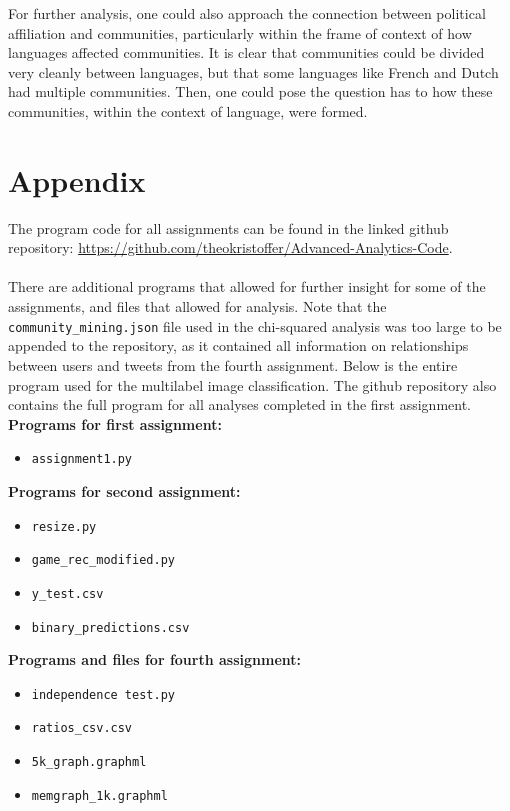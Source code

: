 \documentclass{article}
\begin{document}
For further analysis, one could also approach the connection between political affiliation and communities, particularly within the frame of context of how languages affected communities. It is clear that communities could be divided very cleanly between languages, but that some languages like French and Dutch had multiple communities. Then, one could pose the question has to how these communities, within the context of language, were formed. \



















\newpage


\section{Appendix}

The program code for all assignments can be found in the linked github repository: \url{https://github.com/theokristoffer/Advanced-Analytics-Code}.
\\\href{https://github.com/theokristoffer/Advanced-Analytics-Code}
\\

There are additional programs that allowed for further insight for some of the assignments, and files that allowed for analysis.
Note that the \verb|community_mining.json| file used in the chi-squared analysis was too large to be appended to the repository, as it contained all information on relationships between users and tweets from the fourth assignment. Below is the entire program used for the multilabel image classification. The github repository also contains the full program for all analyses completed in the first assignment. \\

\textbf{Programs for first assignment:} 
\begin{itemize}
    \item \verb|assignment1.py|
\end{itemize}


\textbf{Programs for second assignment:}
\begin{itemize}
    \item \verb|resize.py|
    \item \verb|game_rec_modified.py|
    \item \verb|y_test.csv|
    \item \verb|binary_predictions.csv|
\end{itemize}

\textbf{Programs and files for fourth assignment:} 
\begin{itemize}
    \item \verb|independence test.py|
    \item \verb|ratios_csv.csv|
    \item \verb|5k_graph.graphml|
    \item \verb|memgraph_1k.graphml|
\end{itemize}
\end{document}
